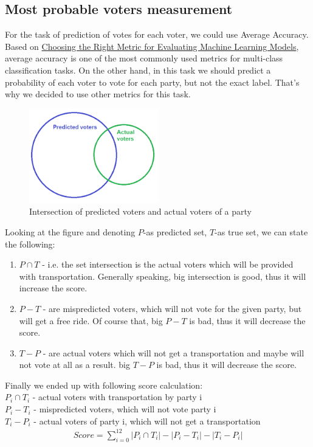 \documentclass[12pt]{article}
\begin{document}
\subsection{Most probable voters measurement}
For the task of prediction of votes for each voter, we could use Average Accuracy. Based on 
\href{https://medium.com/usf-msds/choosing-the-right-metric-for-evaluating-machine-learning-models-part-2-86d5649a5428}{Choosing the Right Metric for Evaluating Machine Learning Models}, average accuracy is one of the most commonly used metrics for multi-class classification tasks. On the other hand, in this task we should predict a probability of each voter to vote for each party, but not the exact label. That's why we decided to use other metrics for this task.
\begin{figure}[h]
\centering
\includegraphics[width=0.5\textwidth]{report_pics/sets}
\caption{Intersection of predicted voters and actual voters of a party}
\end{figure}
Looking at the figure and denoting $P$-as predicted set, $T$-as true set, we can state the following:
\begin{enumerate}
	\item $P \cap T$ - i.e. the set intersection is the actual voters which will be provided with transportation. Generally speaking, big intersection is good, thus it will increase the score.
	\item $P-T$ - are mispredicted voters, which will not vote for the given party, but will get a free ride. Of course that, big $P-T$ is bad, thus it will decrease the score.
	\item $T-P$ - are actual voters which will not get a transportation and maybe will not vote at all as a result. big $T-P$ is bad, thus it will decrease the score.
\end{enumerate} 
Finally we ended up with following score calculation:\\
$P_i \cap T_i$ - actual voters with transportation by party i \\
   $P_i - T_i$ - mispredicted voters, which will not vote party i \\
   $T_i -P_i$ - actual voters of party i, which will not get a transportation \\
\begin{gather*}   
   Score = \sum_{i=0}^{12} |P_i \cap T_i|-|P_i - T_i|-|T_i -P_i|  
\end{gather*}
\end{document}
